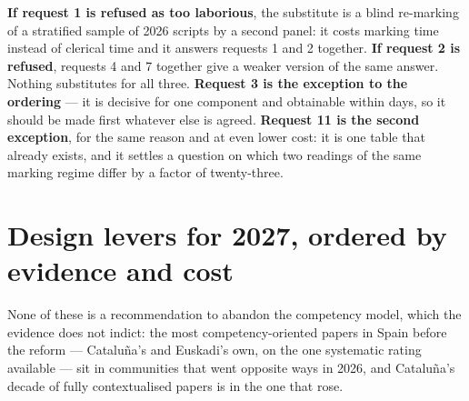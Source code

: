 \documentclass[
  10.5pt,
  a4paper,
  DIV=11,
  numbers=noendperiod]{scrartcl}
\begin{document}
\textbf{If request 1 is refused as too laborious}, the substitute is a
blind re-marking of a stratified sample of 2026 scripts by a second
panel: it costs marking time instead of clerical time and it answers
requests 1 and 2 together. \textbf{If request 2 is refused}, requests 4
and 7 together give a weaker version of the same answer. Nothing
substitutes for all three. \textbf{Request 3 is the exception to the
ordering} --- it is decisive for one component and obtainable within
days, so it should be made first whatever else is agreed.
\textbf{Request 11 is the second exception}, for the same reason and at
even lower cost: it is one table that already exists, and it settles a
question on which two readings of the same marking regime differ by a
factor of twenty-three.

\section{Design levers for 2027, ordered by evidence and
cost}\label{design-levers-for-2027-ordered-by-evidence-and-cost}

None of these is a recommendation to abandon the competency model, which
the evidence does not indict: the most competency-oriented papers in
Spain before the reform --- Cataluña's and Euskadi's own, on the one
systematic rating available --- sit in communities that went opposite
ways in 2026, and Cataluña's decade of fully contextualised papers is in
the one that rose.
\end{document}
